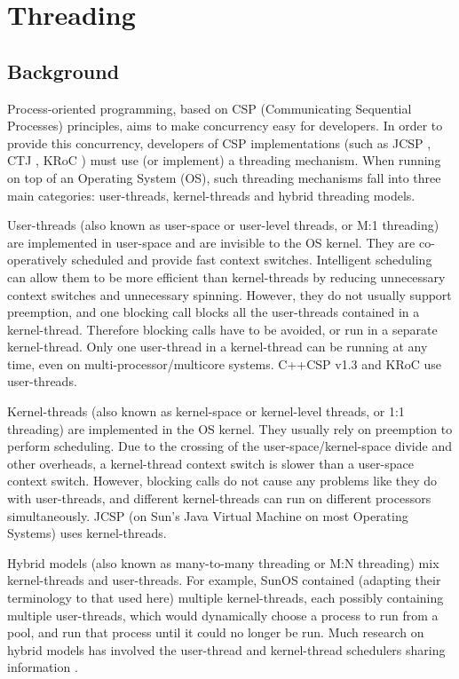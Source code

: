 \documentclass[12pt]{IOS-Book-Article-CPA-2007}
\begin{document}
\section{Threading}

\label{sec-threading}

\subsection{Background}

Process-oriented programming, based on CSP (Communicating Sequential Processes) \cite{hoare-csp-85} principles, aims to make concurrency easy for developers.  In order to provide this concurrency, developers
of CSP implementations (such as JCSP \cite{web-jcsp}, CTJ \cite{web-ctj}, KRoC \cite{web-kroc}) must use (or implement) a threading mechanism.  When running on top of an Operating System (OS), 
such threading mechanisms fall into three main categories: user-threads, kernel-threads and hybrid threading models.

User-threads (also known as user-space or user-level threads, or M:1 threading) are implemented in user-space and are invisible to the OS kernel.  
They are co-operatively scheduled and provide fast context switches.  Intelligent scheduling can allow them to be more efficient than kernel-threads by reducing unnecessary context switches and unnecessary
spinning.  However, they do not usually support preemption, and one blocking call blocks all the user-threads contained in a kernel-thread.  Therefore 
blocking calls have to be avoided, or run in a separate kernel-thread.  Only one user-thread in a kernel-thread can be running at any time, even on multi-processor/multicore systems.  
C++CSP v1.3 and KRoC use user-threads.

Kernel-threads (also known as kernel-space or kernel-level threads, or 1:1 threading) are implemented in the OS kernel.  They usually rely on preemption to perform scheduling.  Due to the crossing of the user-space/kernel-space
divide and other overheads, a kernel-thread context switch is slower than a user-space context switch.  However, blocking calls do not cause any problems
like they do with user-threads, and different kernel-threads can run on different processors simultaneously.  JCSP (on Sun's Java Virtual Machine on most Operating Systems) uses kernel-threads.

Hybrid models (also known as many-to-many threading or M:N threading) mix kernel-threads and user-threads.  For example, SunOS contained (adapting their terminology to
that used here) multiple kernel-threads, each possibly containing multiple user-threads, which would dynamically choose a process to run from a pool, and
run that process until it could no longer be run.  Much research on hybrid models has involved the user-thread and kernel-thread schedulers sharing
information \cite{anderson-threads-92,marsh-threads-91}.
\end{document}
